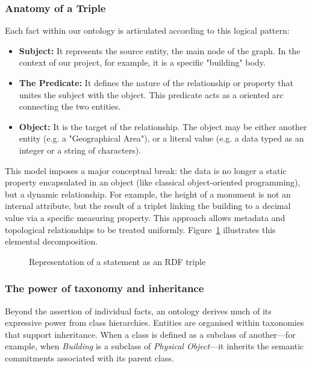 \documentclass{article}
\begin{document}
\subsubsection{Anatomy of a Triple}
Each fact within our ontology is articulated according to this logical pattern:
\begin{itemize}
\item \textbf{Subject:} It represents the source entity, the main node of the graph. In the context of our project, for example, it is a specific "building" body.
\item \textbf{The Predicate:} It defines the nature of the relationship or property that unites the subject with the object. This predicate acts as a oriented arc connecting the two entities.
\item \textbf {Object:} It is the target of the relationship. The object may be either another entity (e.g. a "Geographical Area"), or a literal value (e.g. a data typed as an integer or a string of characters).
\end{itemize}

This model imposes a major conceptual break: the data is no longer a static property encapsulated in an object (like classical object-oriented programming), but a dynamic relationship. For example, the height of a monument is not an internal attribute, but the result of a triplet linking the building to a decimal value via a specific measuring property. This approach allows metadata and topological relationships to be treated uniformly. Figure~\ref{fig:rdf-triplet} illustrates this elemental decomposition.

\begin{figure}[htbp]
\centering
\caption{Representation of a statement as an RDF triple}
\label{fig:rdf-triplet}
\end{figure}


\subsubsection {The power of taxonomy and inheritance }
Beyond the assertion of individual facts, an ontology derives much of its expressive power from class hierarchies. Entities are organised within taxonomies that support inheritance. When a class is defined as a subclass of another---for example, when \textit{Building} is a subclass of \textit{Physical Object}---it inherits the semantic commitments associated with its parent class.
\end{document}
